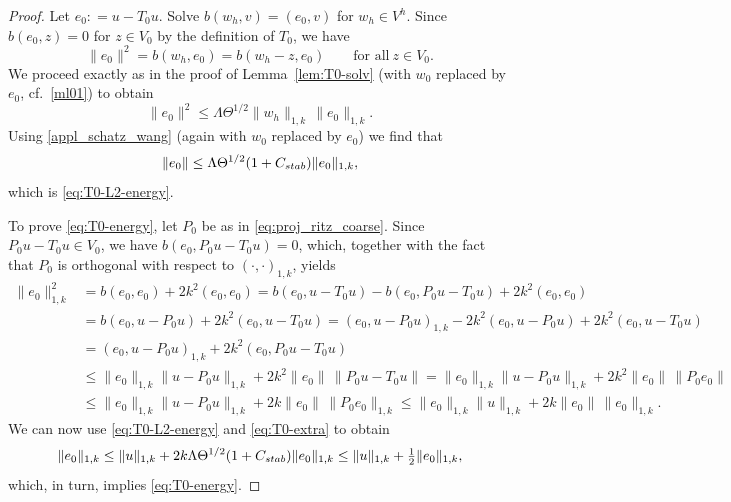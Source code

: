 \documentclass[10pt,a4paper]{amsart}
\newcommand{\Cstab}{C_{\textup{\textsf{stab}}}}
\newcommand{\assign}{\mathrel{\mathop:}=}
\begin{document}
\begin{proof}
Let $e_0\assign u-T_0 u$.  Solve $b(w_h,v)=(e_0,v)$ for $w_h\in V^h$.
Since $b(e_0,z)=0$ for $z\in V_0$ by the definition of $T_0$, we have
\[
	\|e_0\|^2 = b(w_h,e_0) = b(w_h-z,e_0)\qquad\text{for all} \ z\in V_0.
\]
We proceed exactly as in the proof of Lemma~\ref{lem:T0-solv} (with $w_0$ replaced by $e_0$, cf.\ \eqref{ml01}) to obtain
\[
	\|e_0\|^2 \le \Lambda\Theta^{1/2}\|w_h\|_{1, k}^{\phantom{1}}\,\|e_0\|_{1, k}.
\]
Using \eqref{appl_schatz_wang} (again with $w_0$ replaced by $e_0$) we find that
\[
	\|e_0\| \le \Lambda\Theta^{1/2}(1+\Cstab)\|e_0\|_{1,k},
\]
which is \eqref{eq:T0-L2-energy}. 

To prove \eqref{eq:T0-energy}, let $P_0$ be as in \eqref{eq:proj_ritz_coarse}.
Since $P_0u-T_0u\in V_0$, we have $b(e_0,P_0u-T_0u)=0$, which, together with the fact that $P_0$ 
is orthogonal with respect to $(\cdot, \cdot)_{1, k}$, yields
\begin{align*}
	\|e_0\|_{1, k}^2 &= b(e_0,e_0) + 2k^2(e_0,e_0)
	= b(e_0,u-T_0u) - b(e_0,P_0u-T_0u) + 2k^2(e_0,e_0)
	\\[1ex]
	&= b(e_0,u-P_0u) + 2k^2(e_0,u-T_0u)
	= (e_0,u-P_0u)_{1,k} - 2k^2(e_0,u-P_0u) + 2k^2(e_0,u-T_0u)
	\\[1ex]
	&= (e_0,u-P_0u)_{1, k} + 2k^2(e_0,P_0u-T_0u)
	\\[1ex]
	&\le \|e_0\|_{1, k} \|u-P_0u\|_{1, k} + 2k^2\|e_0\|\,\|P_0u-T_0u\|
	= \|e_0\|_{1, k} \|u-P_0u\|_{1, k} + 2 k^2 \|e_0\|\,\|P_0e_0\|
	\\[1ex]
	&\le \|e_0\|_{1, k} \|u-P_0u\|_{1, k} + 2 k\|e_0\|\,\|P_0e_0\|_{1, k}
	\le \|e_0\|_{1, k} \|u\|_{1, k} + 2 k\|e_0\|\,\|e_0\|_{1, k}.
\end{align*}
We can now use \eqref{eq:T0-L2-energy} and \eqref{eq:T0-extra} to obtain
\[
	\|e_0\|_{1, k} \le \|u\|_{1, k} + 2k\Lambda\Theta^{1/2}(1+\Cstab)\|e_0\|_{1, k}
	\le \|u\|_{1, k} + \tfrac12\|e_0\|_{1, k},
\]
which, in turn, implies \eqref{eq:T0-energy}.
\end{proof}
\end{document}
